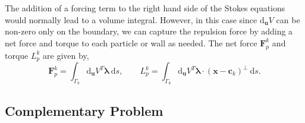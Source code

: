\documentclass[preprint, 10pt]{elsarticle}
\begin{document}
The addition of a forcing term to the right hand side of the Stokes equations
would normally lead to a volume integral. However, in this case since
$\text{d}_{\mathbf{u}} V$ can be non-zero only on the boundary, we can capture
the repulsion force by adding a net force and torque to each particle or wall as needed. The net force $\mathbf{F}^k_p$ and torque $L^k_p$ are given by,
\[ \mathbf{F}^k_p = \int_{\Gamma_k}
\text{d}_\mathbf{u}V^T\pmb{\lambda}~\text{d}s, \qquad L_p^k = \int_{\Gamma_k}
\text{d}_\mathbf{u}V^T\pmb{\lambda}\cdot(\mathbf{x}-\mathbf{c}_k)^\perp~\text{d}s.\]

\subsection{Complementary Problem}
\end{document}
